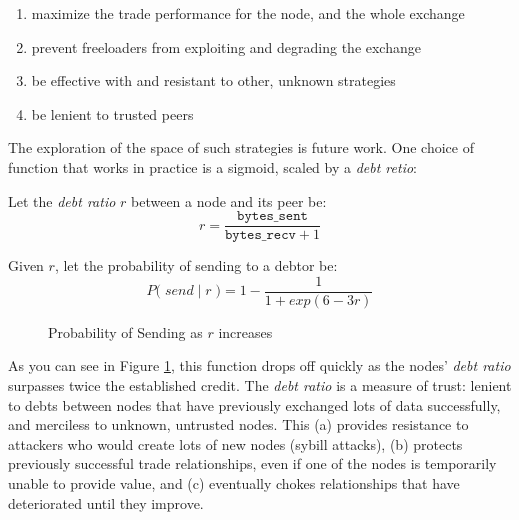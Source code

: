 \documentclass{sig-alternate}
\begin{document}
\begin{enumerate}
  \item maximize the trade performance for the node, and the whole exchange
  \item prevent freeloaders from exploiting and degrading the exchange
  \item be effective with and resistant to other, unknown
  strategies
  \item be lenient to trusted peers
\end{enumerate}

The exploration of the space of such strategies is future work.
One choice of function that works in practice is a sigmoid, scaled by a
\textit{debt retio}:

Let the \textit{debt ratio} $ r $ between a node and its peer be:
  \[ r = \dfrac{\texttt{bytes\_sent}}{\texttt{bytes\_recv} + 1} \]

Given $r$, let the probability of sending to a debtor be:
  \[ P\Big( \; send \; | \; r \;\Big) = 1 - \dfrac{1}{1 + exp(6-3r)} \]

\begin{figure}
\centering
{}
\caption{Probability of Sending as $r$ increases}
\label{fig:psending-graph}
\end{figure}

As you can see in Figure \ref{fig:psending-graph}, this function drops off quickly as the nodes'
\textit{debt ratio} surpasses twice the established credit.
The \textit{debt ratio} is a measure of trust:
lenient to debts between nodes that have previously exchanged lots of data
successfully, and merciless to unknown, untrusted nodes. This
(a) provides resistance to attackers who would create lots of new nodes
(sybill attacks),
(b) protects previously successful trade relationships, even if one of the
nodes is temporarily unable to provide value, and
(c) eventually chokes relationships that have deteriorated until they
improve.
\end{document}
